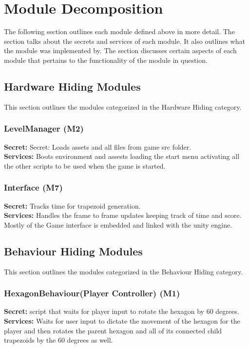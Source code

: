 \documentclass[12pt, titlepage]{article}
\begin{document}
\section{Module Decomposition}
The following section outlines each module defined above in more detail. The section talks about the secrets and services of each module. It also outlines what the module was implemented by. The section discusses certain aspects of each module that pertains to the functionality of the module in question.

\subsection{Hardware Hiding Modules}
\noindent This section outlines the modules categorized in the Hardware Hiding category.

\subsubsection{LevelManager (M2)}
\noindent \textbf{Secret:} Secret: Loads assets and all files from game src folder.\\
\textbf{Services:} Boots environment and assests loading the start menu activating all the other scripts to be used when the game is started.

\subsubsection{Interface (M7)}
\noindent \textbf{Secret:} Tracks time for trapezoid generation. \\
\textbf{Services:} Handles the frame to frame updates keeping track of time and score. Mostly of the Game interface is embedded and linked with the unity engine.



\subsection{Behaviour Hiding Modules}
\noindent This section outlines the modules categorized in the Behaviour Hiding category.
\subsubsection{HexagonBehaviour(Player Controller) (M1)}
\noindent \textbf{Secret:} script that waits for player input to rotate the hexagon by 60 degrees.\\
\textbf{Services:} Waits for user input to dictate the movement of the hexagon for the player and then rotates the parent hexagon and all of its connected child trapezoids by the 60 degrees as well.
\end{document}
